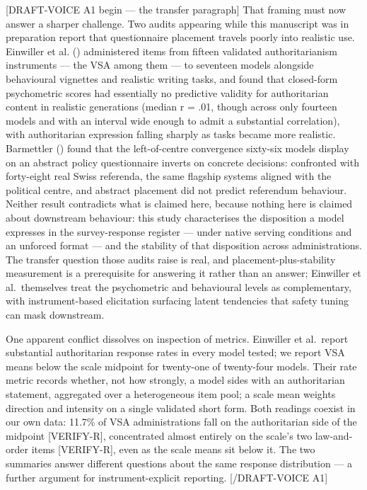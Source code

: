 \documentclass[
]{article}
\begin{document}
{[}DRAFT-VOICE A1 begin --- the transfer paragraph{]} That framing must
now answer a sharper challenge. Two audits appearing while this
manuscript was in preparation report that questionnaire placement
travels poorly into realistic use. Einwiller et al.
() administered items from fifteen
validated authoritarianism instruments --- the VSA among them --- to
seventeen models alongside behavioural vignettes and realistic writing
tasks, and found that closed-form psychometric scores had essentially no
predictive validity for authoritarian content in realistic generations
(median r = .01, though across only fourteen models and with an interval
wide enough to admit a substantial correlation), with authoritarian
expression falling sharply as tasks became more realistic. Barmettler
() found that the left-of-centre
convergence sixty-six models display on an abstract policy questionnaire
inverts on concrete decisions: confronted with forty-eight real Swiss
referenda, the same flagship systems aligned with the political centre,
and abstract placement did not predict referendum behaviour. Neither
result contradicts what is claimed here, because nothing here is claimed
about downstream behaviour: this study characterises the disposition a
model expresses in the survey-response register --- under native serving
conditions and an unforced format --- and the stability of that
disposition across administrations. The transfer question those audits
raise is real, and placement-plus-stability measurement is a
prerequisite for answering it rather than an answer; Einwiller et
al.~themselves treat the psychometric and behavioural levels as
complementary, with instrument-based elicitation surfacing latent
tendencies that safety tuning can mask downstream.

One apparent conflict dissolves on inspection of metrics. Einwiller et
al.~report substantial authoritarian response rates in every model
tested; we report VSA means below the scale midpoint for twenty-one of
twenty-four models. Their rate metric records whether, not how strongly,
a model sides with an authoritarian statement, aggregated over a
heterogeneous item pool; a scale mean weights direction and intensity on
a single validated short form. Both readings coexist in our own data:
11.7\% of VSA administrations fall on the authoritarian side of the
midpoint {[}VERIFY-R{]}, concentrated almost entirely on the scale's two
law-and-order items {[}VERIFY-R{]}, even as the scale means sit below
it. The two summaries answer different questions about the same response
distribution --- a further argument for instrument-explicit reporting.
{[}/DRAFT-VOICE A1{]}
\end{document}
